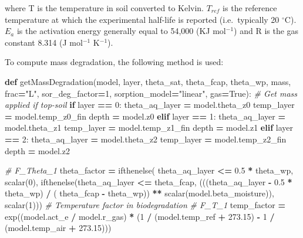 \documentclass[]{article}
\newenvironment{Shaded}{\begin{snugshade}}{\end{snugshade}}
\newcommand{\KeywordTok}[1]{\textcolor[rgb]{0.13,0.29,0.53}{\textbf{{#1}}}}
\newcommand{\DecValTok}[1]{\textcolor[rgb]{0.00,0.00,0.81}{{#1}}}
\newcommand{\FloatTok}[1]{\textcolor[rgb]{0.00,0.00,0.81}{{#1}}}
\newcommand{\StringTok}[1]{\textcolor[rgb]{0.31,0.60,0.02}{{#1}}}
\newcommand{\CommentTok}[1]{\textcolor[rgb]{0.56,0.35,0.01}{\textit{{#1}}}}
\newcommand{\VariableTok}[1]{\textcolor[rgb]{0.00,0.00,0.00}{{#1}}}
\newcommand{\ControlFlowTok}[1]{\textcolor[rgb]{0.13,0.29,0.53}{\textbf{{#1}}}}
\newcommand{\OperatorTok}[1]{\textcolor[rgb]{0.81,0.36,0.00}{\textbf{{#1}}}}
\newcommand{\NormalTok}[1]{{#1}}
\begin{document}
where T is the temperature in soil converted to Kelvin. \(T_{ref}\) is
the reference temperature at which the experimental half-life is
reported (i.e.~typically 20 \(^{\circ}\)C). \(E_a\) is the activation
energy generally equal to 54,000 (KJ mol\(^{-1}\)) and R is the gas
constant 8.314 (J mol\(^{-1}\) K\(^{-1}\)).

To compute mass degradation, the following method is used:

\begin{Shaded}
\begin{Highlighting}[]
\KeywordTok{def} \NormalTok{getMassDegradation(model, layer,}
                       \NormalTok{theta_sat, theta_fcap, theta_wp,}
                       \NormalTok{mass, frac}\OperatorTok{=}\StringTok{"L"}\NormalTok{, sor_deg_factor}\OperatorTok{=}\DecValTok{1}\NormalTok{,}
                       \NormalTok{sorption_model}\OperatorTok{=}\StringTok{"linear"}\NormalTok{, gas}\OperatorTok{=}\VariableTok{True}\NormalTok{):}
    \CommentTok{# Get mass applied if top-soil}
    \ControlFlowTok{if} \NormalTok{layer }\OperatorTok{==} \DecValTok{0}\NormalTok{:}
        \NormalTok{theta_aq_layer }\OperatorTok{=} \NormalTok{model.theta_z0}
        \NormalTok{temp_layer }\OperatorTok{=} \NormalTok{model.temp_z0_fin}
        \NormalTok{depth }\OperatorTok{=} \NormalTok{model.z0}
    \ControlFlowTok{elif} \NormalTok{layer }\OperatorTok{==} \DecValTok{1}\NormalTok{:}
        \NormalTok{theta_aq_layer }\OperatorTok{=} \NormalTok{model.theta_z1}
        \NormalTok{temp_layer }\OperatorTok{=} \NormalTok{model.temp_z1_fin}
        \NormalTok{depth }\OperatorTok{=} \NormalTok{model.z1}
    \ControlFlowTok{elif} \NormalTok{layer }\OperatorTok{==} \DecValTok{2}\NormalTok{:}
        \NormalTok{theta_aq_layer }\OperatorTok{=} \NormalTok{model.theta_z2}
        \NormalTok{temp_layer }\OperatorTok{=} \NormalTok{model.temp_z2_fin}
        \NormalTok{depth }\OperatorTok{=} \NormalTok{model.z2}

    \CommentTok{# F_Theta_1}
    \NormalTok{theta_factor }\OperatorTok{=} \NormalTok{ifthenelse(}
        \NormalTok{theta_aq_layer }\OperatorTok{<=} \FloatTok{0.5} \OperatorTok{*} \NormalTok{theta_wp, scalar(}\DecValTok{0}\NormalTok{),}
        \NormalTok{ifthenelse(theta_aq_layer }\OperatorTok{<=} \NormalTok{theta_fcap,}
                   \NormalTok{(((theta_aq_layer }\OperatorTok{-} \FloatTok{0.5} \OperatorTok{*} \NormalTok{theta_wp) }\OperatorTok{/} \NormalTok{(}
                       \NormalTok{theta_fcap }\OperatorTok{-} \NormalTok{theta_wp)) }\OperatorTok{**} \NormalTok{scalar(model.beta_moisture)),}
                   \NormalTok{scalar(}\DecValTok{1}\NormalTok{)))}
    \CommentTok{# Temperature factor in biodegradation}
    \CommentTok{# F_T_1}
    \NormalTok{temp_factor }\OperatorTok{=} \NormalTok{exp((model.act_e }\OperatorTok{/} \NormalTok{model.r_gas) }\OperatorTok{*}
                      \NormalTok{(}\DecValTok{1} \OperatorTok{/} \NormalTok{(model.temp_ref }\OperatorTok{+} \FloatTok{273.15}\NormalTok{) }\OperatorTok{-} \DecValTok{1} \OperatorTok{/} \NormalTok{(model.temp_air }\OperatorTok{+} \FloatTok{273.15}\NormalTok{)))}


\end{Highlighting}
\end{Shaded}
\end{document}
